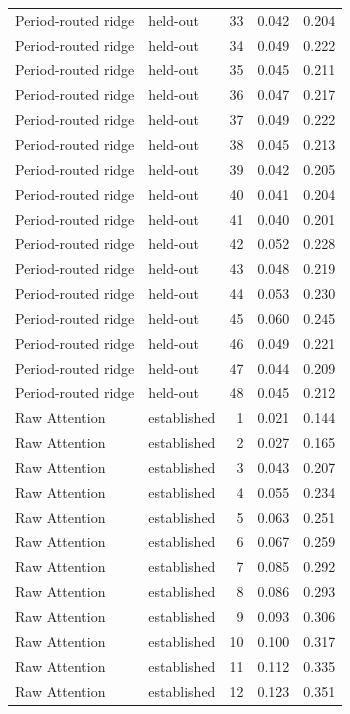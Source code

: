 \begin{tabular}{llrrr}
Period-routed ridge & held-out & 33 & 0.042 & 0.204 \\
Period-routed ridge & held-out & 34 & 0.049 & 0.222 \\
Period-routed ridge & held-out & 35 & 0.045 & 0.211 \\
Period-routed ridge & held-out & 36 & 0.047 & 0.217 \\
Period-routed ridge & held-out & 37 & 0.049 & 0.222 \\
Period-routed ridge & held-out & 38 & 0.045 & 0.213 \\
Period-routed ridge & held-out & 39 & 0.042 & 0.205 \\
Period-routed ridge & held-out & 40 & 0.041 & 0.204 \\
Period-routed ridge & held-out & 41 & 0.040 & 0.201 \\
Period-routed ridge & held-out & 42 & 0.052 & 0.228 \\
Period-routed ridge & held-out & 43 & 0.048 & 0.219 \\
Period-routed ridge & held-out & 44 & 0.053 & 0.230 \\
Period-routed ridge & held-out & 45 & 0.060 & 0.245 \\
Period-routed ridge & held-out & 46 & 0.049 & 0.221 \\
Period-routed ridge & held-out & 47 & 0.044 & 0.209 \\
Period-routed ridge & held-out & 48 & 0.045 & 0.212 \\
Raw Attention & established & 1 & 0.021 & 0.144 \\
Raw Attention & established & 2 & 0.027 & 0.165 \\
Raw Attention & established & 3 & 0.043 & 0.207 \\
Raw Attention & established & 4 & 0.055 & 0.234 \\
Raw Attention & established & 5 & 0.063 & 0.251 \\
Raw Attention & established & 6 & 0.067 & 0.259 \\
Raw Attention & established & 7 & 0.085 & 0.292 \\
Raw Attention & established & 8 & 0.086 & 0.293 \\
Raw Attention & established & 9 & 0.093 & 0.306 \\
Raw Attention & established & 10 & 0.100 & 0.317 \\
Raw Attention & established & 11 & 0.112 & 0.335 \\
Raw Attention & established & 12 & 0.123 & 0.351 \\

\end{tabular}
